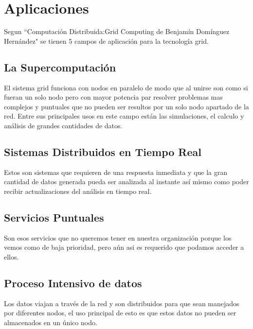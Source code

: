 \documentclass[12pt]{article}
\begin{document}
{%
\newpage
{\raggedright
\section{Aplicaciones}
Segun ``Computaci\'on Distribuida:Grid Computing de Benjam\'in Dom\'inguez Hern\'andez" se tienen 5 campos de aplicaci\'on para la tecnolog\'ia grid.
\\
\subsection{La Supercomputaci\'on}
El sistema grid funciona con nodos en paralelo de modo que al unirse son como si fueran un solo nodo pero con mayor potencia par resolver problemas mas complejos y puntuales que no pueden ser resultos por un solo nodo apartado de la red.
Entre sus principales usos en este campo est\'an las simulaciones, el calculo y an\'alisis de grandes cantidades de datos.
\subsection{Sistemas Distribuidos en Tiempo Real}
Estos son sistemas que requieren de una respuesta inmediata y que la gran cantidad de datos generada pueda ser analizada al instante as\'i mismo como poder recibir actualizaciones del an\'alisis en tiempo real.
\subsection{Servicios Puntuales}
Son esos servicios que no queremos tener en nuestra organizaci\'on porque los vemos como de baja prioridad, pero a\'un asi es requerido que podamos acceder a ellos.
\subsection{Proceso Intensivo de datos}
Los datos viajan a trav\'es de la red y son distribuidos para que sean manejados por diferentes nodos, el uso principal de esto es que estos datos no pueden ser almacenados en un \'unico nodo.
}}
\end{document}
